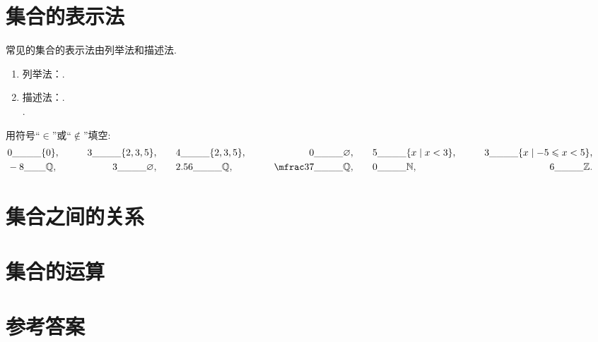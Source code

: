 \section{集合的表示法}
  \begin{framed}\hspace{-25pt}{\heiti 知识点}\par
    \hspace{-10pt}常见的集合的表示法由列举法和描述法.\par
    \begin{enumerate}\vspace{-10pt}
      \item {\fangsong 列举法}：.
            \\
      \item {\fangsong 描述法}：.
            \\.
    \end{enumerate}
  \end{framed}
  \begin{exercise}
    \item 用符号“$\in$”或“$\notin$”填空:
          \begin{align*}
            &0 \_\_\_\_\{0\}, \qquad &3 \_\_\_\_\{2,3,5\}, \qquad &4 \_\_\_\_\{2,3,5\}, \qquad &0 \_\_\_\_\varnothing, \qquad &5 \_\_\_\_\{x \mid x<3  \}, \qquad &3 \_\_\_\_\{x \mid -5\leqslant x<5\}, \qquad
            \\ 
            &-8 \_\_\_\mathbb{Q}, \qquad &3 \_\_\_\_\varnothing, \qquad &2.56 \_\_\_\_\mathbb{Q}, \qquad 
            &\mfrac37 \_\_\_\_\mathbb{Q}, \qquad &0 \_\_\_\_\mathbb{N}, \qquad &6 \_\_\_\_\mathbb{Z}. \qquad
          \end{align*}
  \end{exercise}
\section{集合之间的关系}
\section{集合的运算}
\section{}


%
\stopexercise

\newpage
\section{参考答案}
\begin{multicols}{2}
  \printanswer
\end{multicols}
